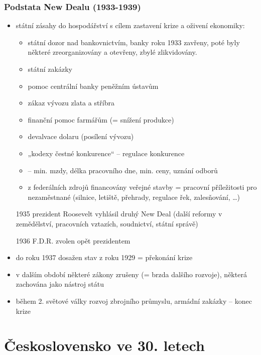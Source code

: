 \documentclass{article}
\begin{document}
\subsubsection*{Podstata New Dealu (1933-1939)}
\begin{itemize}
    \item státní zásahy do hospodářství s cílem zastavení krize a oživení ekonomiky:
    \begin{itemize}
        \item státní dozor nad bankovnictvím, banky roku 1933 zavřeny, poté byly některé zreorganizovány a otevřeny, zbylé zlikvidovány.
        \item státní zakázky
        \item pomoc centrální banky peněžním ústavům
        \item zákaz vývozu zlata a stříbra
        \item finanční pomoc farmářům (= snížení produkce)
        \item devalvace dolaru (posílení vývozu)
        \item „kodexy čestné konkurence“ – regulace konkurence
        \item {} -- min. mzdy, délka pracovního dne, min. ceny, uznání odborů
        \item z federálních zdrojů financovány veřejné stavby = pracovní příležitosti pro nezaměstnané (silnice, letiště, přehrady, regulace řek, zalesňování, …)
    \end{itemize}
    \item[1935] prezident Roosevelt vyhlásil druhý New Deal (další reformy v zemědělství, pracovních vztazích, soudnictví, státní správě)
    \item[1936] F.D.R. zvolen opět prezidentem
    \item do roku 1937 dosažen stav z roku 1929 = překonání krize
    \item v dalším období některé zákony zrušeny (= brzda dalšího rozvoje), některá zachována jako nástroj státu
    \item během 2. světové války rozvoj zbrojního průmyslu, armádní zakázky – konec krize
\end{itemize}

\section*{Československo ve 30. letech}
\end{document}
